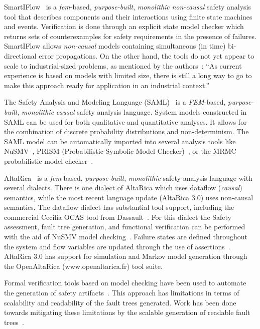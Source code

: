 SmartIFlow~\cite{info17:HaLuHo} is a {\em \gls{fem}}-based, {\em purpose-built}, {\em monolithic} {\em non-causal} safety analysis tool that describes components and their interactions using finite state machines and events. Verification is done through an explicit state model checker which returns sets of counterexamples for safety requirements in the presence of failures.  SmartIFlow allows {\em non-causal} models containing simultaneous (in time) bi-directional %
error propagations.  On the other hand, the tools do not yet appear to scale to industrial-sized problems, as mentioned by the authors~\cite{info17:HaLuHo}: ``As current experience is based on models with limited size, there is still a long way to go to make this approach ready for application in an industrial context.''

The Safety Analysis and Modeling Language (SAML)~\cite{Gudemann:2010:FQQ:1909626.1909813} is a {\em FEM}-based, {\em purpose-built}, {\em monolithic} {\em causal} safety analysis language.  System models constructed in SAML can be used for both qualitative and quantitative analyses. It allows for the combination of discrete probability distributions and non-determinism. The SAML model can be automatically imported into several analysis tools like NuSMV~\cite{Cimatti2000}, PRISM (Probabilistic Symbolic Model Checker)~\cite{CAV2011:KwNoPa}, or the MRMC probabilistic model checker~\cite{Katoen:2005:MRM:1114692.1115230}. 

AltaRica~\cite{PROSVIRNOVA2013127,BieberERTS2018} is a {\em \gls{fem}}-based, {\em purpose-built}, {\em monolithic} safety analysis language with several dialects.  There is one dialect of AltaRica which uses dataflow ({\em causal}) semantics, while the most recent language update (AltaRica 3.0) uses non-causal semantics.  The dataflow dialect has substantial tool support, including the commercial Cecilia OCAS tool from Dassault~\cite{Bieber04safetyassessment}.  For this dialect the Safety assessment, fault tree generation, and functional verification can be performed with the aid of NuSMV model checking~\cite{symbAltaRica}. Failure states are defined throughout the system and flow variables are updated through the use of assertions~\cite{BieberERTS2018}.  AltaRica 3.0 has support for simulation and Markov model generation through the OpenAltaRica (www.openaltarica.fr) tool suite.

Formal verification tools based on model checking have been used to automate the generation of safety artifacts~\cite{symbAltaRica,10.1007/978-3-540-75596-8-13, DBLP:conf/tacas/BittnerBCCGGMMZ16}. This approach has limitations in terms of scalability and readability of the fault trees generated. Work has been done towards mitigating these limitations by the scalable generation of readable fault trees~\cite{10.1007/978-3-319-11936-6-7}.




